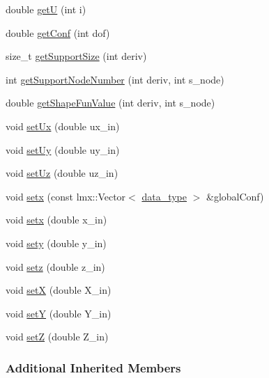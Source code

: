 \begin{DoxyCompactItemize}
\item 
double \hyperlink{classmknix_1_1_node_aa89f59c02a90102c9b4aa90848afd79c}{get\-U} (int i)
\item 
double \hyperlink{classmknix_1_1_node_aec7a69d8e7b6ea71636b1b2ac6d30e1a}{get\-Conf} (int dof)
\item 
size\-\_\-t \hyperlink{classmknix_1_1_node_aaa7a577ee98149ca2b82711e4aa0e77a}{get\-Support\-Size} (int deriv)
\item 
int \hyperlink{classmknix_1_1_node_a209f5158efc66c282da2be880535c392}{get\-Support\-Node\-Number} (int deriv, int s\-\_\-node)
\item 
double \hyperlink{classmknix_1_1_node_a6051733b173a21813c1d111ae18f0e61}{get\-Shape\-Fun\-Value} (int deriv, int s\-\_\-node)
\item 
void \hyperlink{classmknix_1_1_node_adfbc2fbcbf12becd4a498cbdc6d85cb3}{set\-Ux} (double ux\-\_\-in)
\item 
void \hyperlink{classmknix_1_1_node_a76378e1cb2f9d9021d44789e85a75012}{set\-Uy} (double uy\-\_\-in)
\item 
void \hyperlink{classmknix_1_1_node_a522e185e16432892a3cee169b442035d}{set\-Uz} (double uz\-\_\-in)
\item 
void \hyperlink{classmknix_1_1_node_a1c86d8d88d55ab3bfd8dbba79a61743c}{setx} (const lmx\-::\-Vector$<$ \hyperlink{namespacemknix_a16be4b246fbf2cceb141e3a179111020}{data\-\_\-type} $>$ \&global\-Conf)
\item 
void \hyperlink{classmknix_1_1_node_ab9e70316fb81d733fed68dc0ce9e3104}{setx} (double x\-\_\-in)
\item 
void \hyperlink{classmknix_1_1_node_acd378f389e87b0711acec44969249696}{sety} (double y\-\_\-in)
\item 
void \hyperlink{classmknix_1_1_node_a592df726bbac32dd5ed5a5e1cd378f6f}{setz} (double z\-\_\-in)
\item 
void \hyperlink{classmknix_1_1_node_aac32e597e1ec0bb85fabcbd2f14d0348}{set\-X} (double X\-\_\-in)
\item 
void \hyperlink{classmknix_1_1_node_acd17b4ac110feaa43430839b6aad107b}{set\-Y} (double Y\-\_\-in)
\item 
void \hyperlink{classmknix_1_1_node_aa294c096ab343766756ca8e5c6ec7f26}{set\-Z} (double Z\-\_\-in)
\end{DoxyCompactItemize}
\subsubsection*{Additional Inherited Members}


